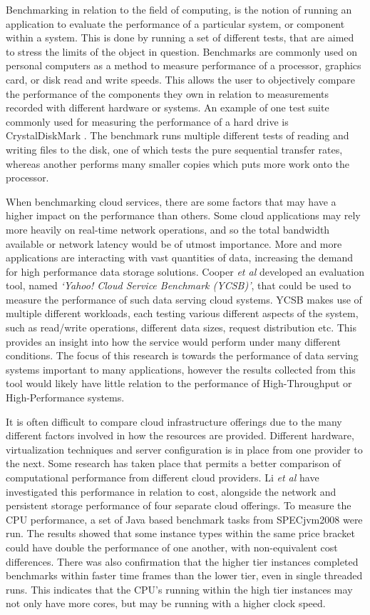 \documentclass[conference]{IEEEtran}
\begin{document}
Benchmarking in relation to the field of computing, is the notion of running an application to evaluate the performance of a particular system, or component within a system. This is done by running a set of different tests, that are aimed to stress the limits of the object in question. Benchmarks are commonly used on personal computers as a method to measure performance of a processor, graphics card, or disk read and write speeds. This allows the user to objectively compare the performance of the components they own in relation to measurements recorded with different hardware or systems. An example of one test suite commonly used for measuring the performance of a hard drive is CrystalDiskMark \cite{crystaldiskmark}. The benchmark runs multiple different tests of reading and writing files to the disk, one of which tests the pure sequential transfer rates, whereas another performs many smaller copies which puts more work onto the processor.

When benchmarking cloud services, there are some factors that may have a higher impact on the performance than others. Some cloud applications may rely more heavily on real-time network operations, and so the total bandwidth available or network latency would be of utmost importance. More and more applications are interacting with vast quantities of data, increasing the demand for high performance data storage solutions. Cooper \textit{et al}\cite{cooper2010benchmarking} developed an evaluation tool, named \textit{`Yahoo! Cloud Service Benchmark (YCSB)'}, that could be used to measure the performance of such data serving cloud systems. YCSB makes use of multiple different workloads, each testing various different aspects of the system, such as read/write operations, different data sizes, request distribution etc. This provides an insight into how the service would perform under many different conditions. The focus of this research is towards the performance of data serving systems important to many applications, however the results collected from this tool would likely have little relation to the performance of High-Throughput or High-Performance systems.

It is often difficult to compare cloud infrastructure offerings due to the many different factors involved in how the resources are provided. Different hardware, virtualization techniques and server configuration is in place from one provider to the next\cite{chhetri2013smart}. Some research has taken place that permits a better comparison of computational performance from different cloud providers. Li \textit{et al}\cite{li2010cloudcmp} have investigated this performance in relation to cost, alongside the network and persistent storage performance of four separate cloud offerings. To measure the CPU performance, a set of Java based benchmark tasks from SPECjvm2008 were run. The results showed that some instance types within the same price bracket could have double the performance of one another, with non-equivalent cost differences. There was also confirmation that the higher tier instances completed benchmarks within faster time frames than the lower tier, even in single threaded runs. This indicates that the CPU's running within the high tier instances may not only have more cores, but may be running with a higher clock speed.
\end{document}
